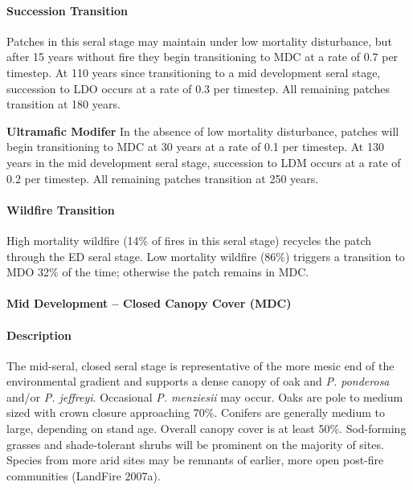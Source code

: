 \paragraph{Succession Transition} Patches in this seral stage may maintain under low mortality disturbance, but after 15 years without fire they begin transitioning to MDC at a rate of 0.7 per timestep. At 110 years since transitioning to a mid development seral stage, succession to LDO occurs at a rate of 0.3 per timestep. All remaining patches transition at 180 years.
\begin{adjustwidth}{2cm}{}

\textbf{Ultramafic Modifer}  In the absence of low mortality disturbance, patches will begin transitioning to MDC at 30 years at a rate of 0.1 per timestep. At 130 years in the mid development seral stage, succession to LDM occurs at a rate of 0.2 per timestep. All remaining patches transition at 250 years.

\end{adjustwidth}
\paragraph{Wildfire Transition}
High mortality wildfire (14\% of fires in this seral stage) recycles the patch through the ED seral stage. Low mortality wildfire (86\%) triggers a transition to MDO 32\% of the time; otherwise the patch remains in MDC.

\noindent\hrulefill

\paragraph{Mid Development – Closed Canopy Cover (MDC)}

\paragraph{Description} The mid-seral, closed seral stage is representative of the more mesic end of the environmental gradient and supports a dense canopy of oak and \emph{P. ponderosa} and/or \emph{P. jeffreyi}. Occasional \emph{P. menziesii} may occur. Oaks are pole to medium sized with crown closure approaching 70\%. Conifers are generally medium to large, depending on stand age. Overall canopy cover is at least 50\%. Sod-forming grasses and shade-tolerant shrubs will be prominent on the majority of sites. Species from more arid sites may be remnants of earlier, more open post-fire communities (LandFire 2007a).

